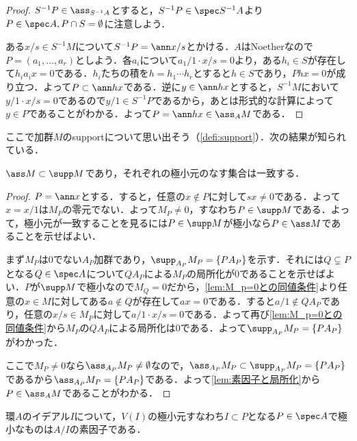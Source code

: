 \begin{proof}
	$S^{-1}P\in\ass_{S^{-1}A}$とすると，$S^{-1}P\in\spec S^{-1}A$より$P\in\spec A,P\cap S=\emptyset$に注意しよう．
	
	ある$x/s\in S^{-1}M$について$S^{-1}P=\ann x/s$とかける．$A$はNoetherなので$P=(a_1,\dots,a_r)$としよう．各$a_i$について$a_1/1\cdot x/s=0$より，ある$h_i\in S$が存在して$h_ia_ix=0$である．$h_i$たちの積を$h=h_1\cdots h_r$とすると$h\in S$であり，$Phx=0$が成り立つ．よって$P\subset\ann hx$である．逆に$y\in\ann hx$とすると，$S^{-1}M$において$y/1\cdot x/s=0$であるので$y/1\in S^{-1}P$であるから，あとは形式的な計算によって$y\in P$であることがわかる．よって$P=\ann hx\in\ass_A M$である．
\end{proof}

ここで加群$M$のsupportについて思い出そう（\ref{defi:support}）．次の結果が知られている．
\begin{thm}\label{thm:assとsuppの極小元}
	$\ass M\subset\supp M$であり，それぞれの極小元のなす集合は一致する．
\end{thm}

\begin{proof}
	$ P=\ann x$とする．すると，任意の$x\not\in P$に対して$sx\neq0$である．よって$x=x/1$は$M_ P$の零元でない．よって$M_ P\neq0$，すなわち$ P\in\supp M$である．よって，極小元が一致することを見るには$P\in\supp M$が極小なら$P\in\ass M$であることを示せばよい．
	
	まず$M_P$は$0$でない$A_P$加群であり，$\supp_{A_P} M_P=\{PA_P\}$を示す．それには$Q\subsetneq P$となる$Q\in\spec A$について$QA_P$による$M_P$の局所化が$0$であることを示せばよい．$P$が$\supp M$で極小なので$M_Q=0$だから，\ref{lem:M_p=0との同値条件}より任意の$x\in M$に対してある$a\not\in Q$が存在して$ax=0$である．すると$a/1\not\in QA_P$であり，任意の$x/s\in M_P$に対して$a/1\cdot x/s=0$である．よって再び\ref{lem:M_p=0との同値条件}から$M_P$の$QA_P$による局所化は$0$である．よって$\supp_{A_P} M_P=\{PA_P\}$がわかった．
	
	ここで$M_P\neq0$なら$\ass_{A_P}M_P\neq\emptyset$なので，$\ass_{A_P}M_P\subset\supp_{A_P}M_P=\{PA_P\}$であるから$\ass_{A_P}M_P=\{PA_P\}$である．よって\ref{lem:素因子と局所化}から$P\in\ass_A M$であることがわかる．
\end{proof}

\begin{cor}\label{cor:min V(I)はass(A/I)の元}
	環$A$のイデアル$I$について，$V(I)$の極小元すなわち$I\subset P$となる$P\in\spec A$で極小なものは$A/I$の素因子である．
\end{cor}

